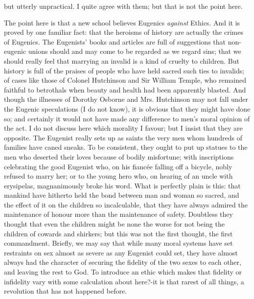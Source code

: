 \documentclass{book}
\begin{document}
but utterly unpractical. I quite agree with them; but that is not the point here.

The point here is that a new school believes Eugenics \emph{against} Ethics. And it is proved by one familiar fact: that the heroisms of history are actually the crimes of Eugenics. The Eugenists’ books and articles are full of suggestions that non-eugenic unions should and may come to be regarded as we regard sins; that we should really feel that marrying an invalid is a kind of cruelty to children. But history is full of the praises of people who have held sacred such ties to invalids; of cases like those of Colonel Hutchinson and Sir William Temple, who remained faithful to betrothals when beauty and health had been apparently blasted. And though the illnesses of Dorothy Osborne and Mrs. Hutchinson may not fall under the Eugenic speculations (I do not know), it is obvious that they might have done so; and certainly it would not have made any difference to men’s moral opinion of the act. I do not discuss here which morality I favour; but I insist that they are opposite. The Eugenist really sets up as saints the very men whom hundreds of families have caned sneaks. To be consistent, they ought to put up statues to the men who deserted their loves because of bodily misfortune; with inscriptions celebrating the good Eugenist who, on his fiancée falling off a bicycle, nobly refused to marry her; or to the young hero who, on hearing of an uncle with erysipelas, magnanimously broke his word. What is perfectly plain is this: that mankind have hitherto held the bond between man and woman so sacred, and the effect of it on the children so incalculable, that they have always admired the maintenance of honour more than the maintenance of safety. Doubtless they thought that even the children might be none the worse for not being the children of cowards and shirkers; but this was not the first thought, the first commandment. Briefly, we may say that while many moral systems have set restraints on sex almost as severe as any Eugenist could set, they have almost always had the character of securing the fidelity of the two sexes to each other, and leaving the rest to God. To introduce an ethic which makes that fidelity or infidelity vary with some calculation about here?-it is that rarest of all things, a revolution that has not happened before.
\end{document}
